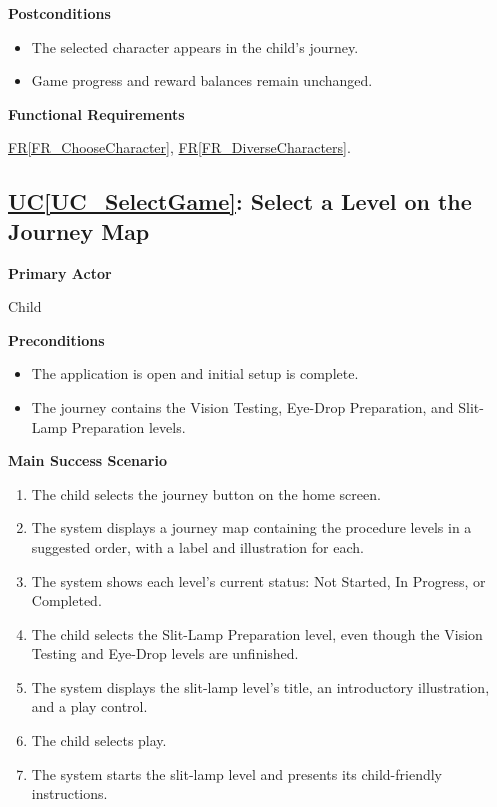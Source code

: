 \documentclass[12pt]{article}
\newcounter{ucnum} %
\newcommand{\ucref}[1]{\hyperref[#1]{UC\ref*{#1}}}
\newcommand{\rref}[1]{\hyperref[#1]{FR\ref*{#1}}}
\begin{document}
\textbf{Postconditions}
\begin{itemize}
    \item The selected character appears in the child's journey.
    \item Game progress and reward balances remain unchanged.
\end{itemize}

\textbf{Functional Requirements}

\rref{FR_ChooseCharacter}, \rref{FR_DiverseCharacters}.

\label{UC_SelectGame}
\subsection{\ucref{UC_SelectGame}: Select a Level on the Journey Map}

\textbf{Primary Actor}

Child

\textbf{Preconditions}
\begin{itemize}
    \item The application is open and initial setup is complete.
    \item The journey contains the Vision Testing, Eye-Drop Preparation,
    and Slit-Lamp Preparation levels.
\end{itemize}

\textbf{Main Success Scenario}
\begin{enumerate}
    \item The child selects the journey button on the home screen.
    \item The system displays a journey map containing the procedure
    levels in a suggested order, with a label and illustration for each.
    \item The system shows each level's current status: Not Started,
    In Progress, or Completed.
    \item The child selects the Slit-Lamp Preparation level, even
    though the Vision Testing and Eye-Drop levels are unfinished.
    \item The system displays the slit-lamp level's title, an
    introductory illustration, and a play control.
    \item The child selects play.
    \item The system starts the slit-lamp level and presents its
    child-friendly instructions.
\end{enumerate}
\end{document}

